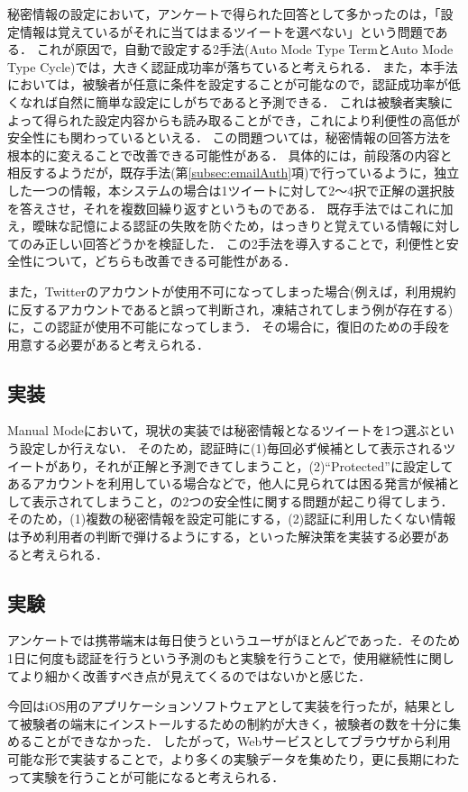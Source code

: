 秘密情報の設定において，アンケートで得られた回答として多かったのは，「設定情報は覚えているがそれに当てはまるツイートを選べない」という問題である．
これが原因で，自動で設定する2手法(Auto Mode Type TermとAuto Mode Type Cycle)では，大きく認証成功率が落ちていると考えられる．
また，本手法においては，被験者が任意に条件を設定することが可能なので，認証成功率が低くなれば自然に簡単な設定にしがちであると予測できる．
これは被験者実験によって得られた設定内容からも読み取ることができ，これにより利便性の高低が安全性にも関わっているといえる．
この問題ついては，秘密情報の回答方法を根本的に変えることで改善できる可能性がある．
具体的には，前段落の内容と相反するようだが，既存手法(第\ref{subsec:emailAuth}項)で行っているように，独立した一つの情報，本システムの場合は1ツイートに対して2〜4択で正解の選択肢を答えさせ，それを複数回繰り返すというものである．
既存手法ではこれに加え，曖昧な記憶による認証の失敗を防ぐため，はっきりと覚えている情報に対してのみ正しい回答どうかを検証した．
この2手法を導入することで，利便性と安全性について，どちらも改善できる可能性がある．

また，Twitterのアカウントが使用不可になってしまった場合(例えば，利用規約に反するアカウントであると誤って判断され，凍結されてしまう例が存在する)に，この認証が使用不可能になってしまう．
その場合に，復旧のための手段を用意する必要があると考えられる．

\subsection{実装}
Manual Modeにおいて，現状の実装では秘密情報となるツイートを1つ選ぶという設定しか行えない．
そのため，認証時に(1)毎回必ず候補として表示されるツイートがあり，それが正解と予測できてしまうこと，(2)``Protected''に設定してあるアカウントを利用している場合などで，他人に見られては困る発言が候補として表示されてしまうこと，の2つの安全性に関する問題が起こり得てしまう．
そのため，(1)複数の秘密情報を設定可能にする，(2)認証に利用したくない情報は予め利用者の判断で弾けるようにする，といった解決策を実装する必要があると考えられる．

\subsection{実験}
アンケートでは携帯端末は毎日使うというユーザがほとんどであった．そのため1日に何度も認証を行うという予測のもと実験を行うことで，使用継続性に関してより細かく改善すべき点が見えてくるのではないかと感じた．

今回はiOS用のアプリケーションソフトウェアとして実装を行ったが，結果として被験者の端末にインストールするための制約が大きく，被験者の数を十分に集めることができなかった．
したがって，Webサービスとしてブラウザから利用可能な形で実装することで，より多くの実験データを集めたり，更に長期にわたって実験を行うことが可能になると考えられる．

\newpage

